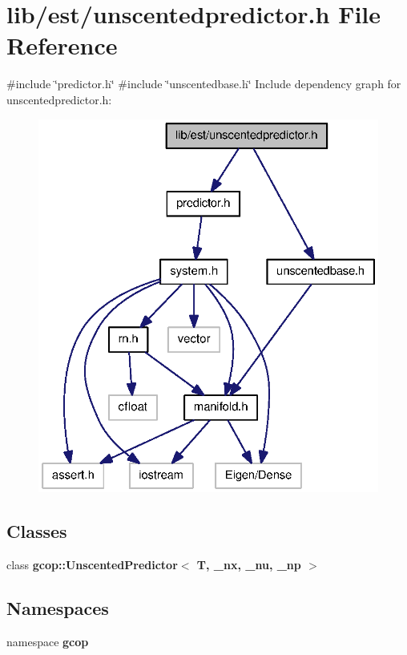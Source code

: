 \section{lib/est/unscentedpredictor.h \-File \-Reference}
\label{unscentedpredictor_8h}
{\ttfamily \#include \char`\"{}predictor.\-h\char`\"{}}\*
{\ttfamily \#include \char`\"{}unscentedbase.\-h\char`\"{}}\*
\-Include dependency graph for unscentedpredictor.\-h\-:
\nopagebreak
\begin{figure}[H]
\begin{center}
\leavevmode
\includegraphics[width=326pt]{unscentedpredictor_8h__incl}
\end{center}
\end{figure}
\subsection*{\-Classes}
\begin{DoxyCompactItemize}
\item 
class {\bf gcop\-::\-Unscented\-Predictor$<$ T, \-\_\-nx, \-\_\-nu, \-\_\-np $>$}
\end{DoxyCompactItemize}
\subsection*{\-Namespaces}
\begin{DoxyCompactItemize}
\item 
namespace {\bf gcop}
\end{DoxyCompactItemize}
